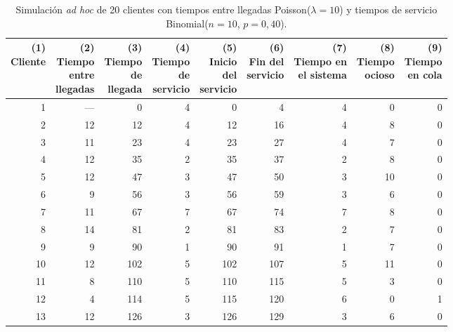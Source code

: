 \begin{table}[H]
\centering
\caption{Simulaci\'on \emph{ad hoc} de 20 clientes con tiempos entre llegadas Poisson($\lambda=10$) y tiempos de servicio Binomial($n=10$, $p=0{,}40$).}
\label{tab:sim20}
\small\setlength{\tabcolsep}{4pt}
\begin{tabular}{@{}rrrrrrrrr@{}}
\toprule
\makecell{(1)\\Cliente} & \makecell{(2)\\Tiempo\\entre\\llegadas} & \makecell{(3)\\Tiempo\\de\\llegada} & \makecell{(4)\\Tiempo\\de\\servicio} & \makecell{(5)\\Inicio\\del\\servicio} & \makecell{(6)\\Fin del\\servicio} & \makecell{(7)\\Tiempo en\\el sistema} & \makecell{(8)\\Tiempo\\ocioso} & \makecell{(9)\\Tiempo\\en cola} \\
\midrule
1 & --- & 0 & 4 & 0 & 4 & 4 & 0 & 0 \\
2 & 12 & 12 & 4 & 12 & 16 & 4 & 8 & 0 \\
3 & 11 & 23 & 4 & 23 & 27 & 4 & 7 & 0 \\
4 & 12 & 35 & 2 & 35 & 37 & 2 & 8 & 0 \\
5 & 12 & 47 & 3 & 47 & 50 & 3 & 10 & 0 \\
6 & 9 & 56 & 3 & 56 & 59 & 3 & 6 & 0 \\
7 & 11 & 67 & 7 & 67 & 74 & 7 & 8 & 0 \\
8 & 14 & 81 & 2 & 81 & 83 & 2 & 7 & 0 \\
9 & 9 & 90 & 1 & 90 & 91 & 1 & 7 & 0 \\
10 & 12 & 102 & 5 & 102 & 107 & 5 & 11 & 0 \\
11 & 8 & 110 & 5 & 110 & 115 & 5 & 3 & 0 \\
12 & 4 & 114 & 5 & 115 & 120 & 6 & 0 & 1 \\
13 & 12 & 126 & 3 & 126 & 129 & 3 & 6 & 0 \\

\end{tabular}
\end{table}
